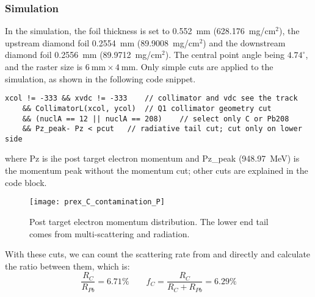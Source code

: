 \subsubsection{Simulation}
In the simulation, the \Pb foil thickness is set to 0.552~mm (628.176~mg/$\mathrm{cm}^2$), 
the upstream diamond foil 0.2554~mm (89.9008~mg/$\mathrm{cm}^2$) and the downstream diamond 
foil 0.2556~mm (89.9712~mg/$\mathrm{cm}^2$). The central point angle being $4.74^\circ$,
and the raster size is $6\ \mathrm{mm} \times 4\ \mathrm{mm}$. 
Only simple cuts are applied to the simulation, as shown in the following code
snippet.
\begin{lstlisting}[style=C]
    xcol != -333 && xvdc != -333    // collimator and vdc see the track
    && CollimatorL(xcol, ycol)	// Q1 collimator geometry cut
    && (nuclA == 12 || nuclA == 208)	// select only C or Pb208
    && Pz_peak- Pz < pcut	// radiative tail cut; cut only on lower side
\end{lstlisting}
where Pz is ihe post target electron momentum and Pz\_peak (948.97~MeV) 
is the momentum peak without the momentum cut; other cuts are explained in the
code block. 

\begin{figure}[H]
    \centering
    \texttt{[image: prex\_C\_contamination\_P]}
    \caption{Post target electron momentum distribution. The lower end tail comes 
    from multi-scattering and radiation.}
\end{figure}

With these cuts, we can count the scattering rate from \C and \Pb directly 
and calculate the ratio between them, which is:
\begin{equation}
    \frac{R_C}{R_{Pb}} = 6.71\%	\qquad f_C = \frac{R_C}{R_C + R_{Pb}} = 6.29\%
\end{equation}

